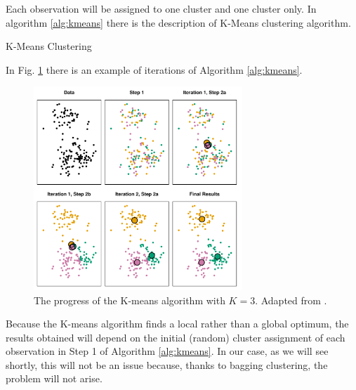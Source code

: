 Each observation will be assigned to one cluster and one cluster only. In algorithm \ref{alg:kmeans} there is the description of K-Means clustering algorithm.
\begin{algorithm}
    \caption{K-Means Clustering}
    \label{alg:kmeans}
    \begin{algorithmic}[1]
    \ENDWHILE
    \end{algorithmic}
\end{algorithm} 
In Fig. \ref{fig:clustiteration} there is an example of iterations of Algorithm \ref{alg:kmeans}.
\begin{figure}
    \centering
    \includegraphics[width=0.7\textwidth]{Images/clustiteration.png}
    \caption[K-Means clustering iterations.]{The progress of the K-means algorithm with $K=3$. Adapted from \cite{james_introduction_2021}.}
    \label{fig:clustiteration}
\end{figure}
Because the K-means algorithm finds a local rather than a global optimum, the results obtained will depend on the initial (random) cluster assignment of each observation in Step 1 of Algorithm \ref{alg:kmeans}. In our case, as we will see shortly, this will not be an issue because, thanks to bagging clustering, the problem will not arise.



